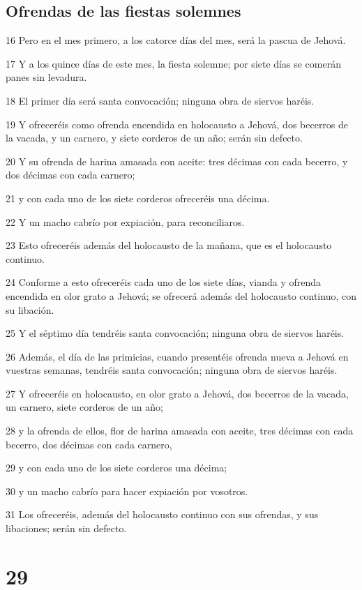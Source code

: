 \section*{Ofrendas de las fiestas solemnes}

\par 16 Pero en el mes primero, a los catorce días del mes, será la pascua de Jehová.
\par 17 Y a los quince días de este mes, la fiesta solemne; por siete días se comerán panes sin levadura. 
\par 18 El primer día será santa convocación; ninguna obra de siervos haréis.
\par 19 Y ofreceréis como ofrenda encendida en holocausto a Jehová, dos becerros de la vacada, y un carnero, y siete corderos de un año; serán sin defecto.
\par 20 Y su ofrenda de harina amasada con aceite: tres décimas con cada becerro, y dos décimas con cada carnero;
\par 21 y con cada uno de los siete corderos ofreceréis una décima.
\par 22 Y un macho cabrío por expiación, para reconciliaros.
\par 23 Esto ofreceréis además del holocausto de la mañana, que es el holocausto continuo.
\par 24 Conforme a esto ofreceréis cada uno de los siete días, vianda y ofrenda encendida en olor grato a Jehová; se ofrecerá además del holocausto continuo, con su libación.
\par 25 Y el séptimo día tendréis santa convocación; ninguna obra de siervos haréis.
\par 26 Además, el día de las primicias, cuando presentéis ofrenda nueva a Jehová en vuestras semanas, tendréis santa convocación; ninguna obra de siervos haréis.
\par 27 Y ofreceréis en holocausto, en olor grato a Jehová, dos becerros de la vacada, un carnero, siete corderos de un año;
\par 28 y la ofrenda de ellos, flor de harina amasada con aceite, tres décimas con cada becerro, dos décimas con cada carnero,
\par 29 y con cada uno de los siete corderos una décima;
\par 30 y un macho cabrío para hacer expiación por vosotros.
\par 31 Los ofreceréis, además del holocausto continuo con sus ofrendas, y sus libaciones; serán sin defecto.

\chapter{29}

